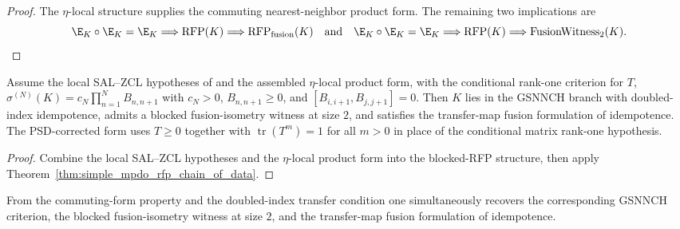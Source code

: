 \begin{proof}\leanok
    The $\eta$-local structure supplies the commuting nearest-neighbor product
    form. The remaining two implications are
    \[
        \E_K\circ\E_K=\E_K \Longrightarrow
        \operatorname{RFP}(K) \Longrightarrow
        \operatorname{RFP}_{\mathrm{fusion}}(K)
        \quad\text{and}\quad
        \E_K\circ\E_K=\E_K \Longrightarrow
        \operatorname{RFP}(K) \Longrightarrow
        \operatorname{FusionWitness}_{2}(K).
    \]
\end{proof}

\begin{theorem}
    \label{thm:simple_mpdo_rfp_chain_of_sal_zcl_and_eta_local_structure}
    \leanok
    Assume the local SAL--ZCL hypotheses of
    \cite[Lemmas~C.2, C.4, and~C.5]{Cirac2016MPDO_arXiv} and the assembled
    $\eta$-local product form, with the conditional rank-one criterion for $T$,
    $\sigma^{(N)}(K)=c_N\prod_{n=1}^N B_{n,n+1}$ with $c_N>0$,
    $B_{n,n+1}\ge 0$, and $[B_{i,i+1},B_{j,j+1}]=0$. Then
    $K$ lies in the GSNNCH branch with doubled-index idempotence, admits a
    blocked fusion-isometry witness at size $2$, and satisfies the
    transfer-map fusion formulation of idempotence. The
    PSD-corrected form uses $T\ge0$ together with
    $\operatorname{tr}(T^m)=1$ for all $m>0$ in place of the conditional
    matrix rank-one hypothesis.
\end{theorem}

\begin{proof}\leanok
    Combine the local SAL--ZCL hypotheses and the $\eta$-local product form into the
    blocked-RFP structure, then apply
    Theorem~\ref{thm:simple_mpdo_rfp_chain_of_data}.
\end{proof}

\begin{theorem}
    \label{thm:simple_mpdo_rfp_chain}
    \leanok
    From the commuting-form property and the doubled-index transfer condition
    one simultaneously recovers the corresponding GSNNCH criterion, the blocked
    fusion-isometry witness at size $2$, and the transfer-map fusion
    formulation of idempotence.
\end{theorem}

